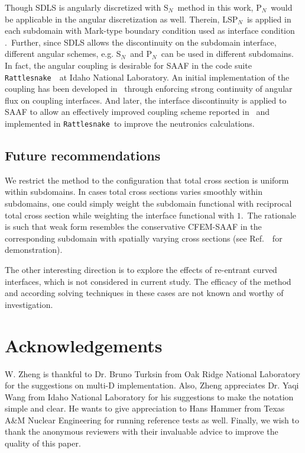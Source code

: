 \documentclass[review]{elsarticle}
\newcommand{\sn}{S$_N$}
\newcommand{\pn}{P$_N$}
\begin{document}
Though SDLS is angularly discretized with \sn\ method in this work, \pn\ would be applicable in the angular discretization as well. Therein, LS\pn\cite{zheng_invite,manteuffel_lspn_scaling,varin_lspn}\ is applied in each subdomain with Mark-type boundary condition used as interface condition \cite{sanchez-transport}.\ Further, since SDLS allows the discontinuity on the subdomain interface, different angular schemes, e.g. \sn\ and \pn\ can be used in different subdomains. {In fact, the angular coupling is desirable for SAAF in the code suite {\tt Rattlesnake}\ \cite{yaqi-rattlesnake}\ at Idaho National Laboratory. An initial implementation of the coupling has been developed in \cite{yaqi_physor16}\ through enforcing strong continuity of angular flux on coupling interfaces. And later, the interface discontinuity is applied to SAAF to allow an effectively improved coupling scheme reported in \cite{yaqi_invite,zheng-inl}\ and implemented in {\tt Rattlesnake}\ to improve the neutronics calculations.}

\subsection{Future recommendations}
{We restrict the method to the configuration that total cross section is uniform within subdomains. In cases total cross sections varies smoothly within subdomains, one could simply weight the subdomain functional with reciprocal total cross section while weighting the interface functional with $1$.\ The rationale is such that weak form resembles the conservative CFEM-SAAF in the corresponding subdomain with spatially varying cross sections (see Ref.\ \cite{zheng_dissertation}\ for demonstration).}

{The other interesting direction is to explore the effects of re-entrant curved interfaces, which is not considered in current study. The efficacy of the method and according solving techniques in these cases are not known and worthy of investigation.}
\section*{Acknowledgements}
W. Zheng is thankful to Dr. Bruno Turksin from Oak Ridge National Laboratory for the suggestions on multi-D implementation. Also, Zheng appreciates Dr. Yaqi Wang from Idaho National Laboratory for his suggestions to make the notation simple and clear. He wants to give appreciation to Hans Hammer from Texas A\&M Nuclear Engineering for running reference tests as well. Finally, we wish to thank the anonymous reviewers with their invaluable advice to improve the quality of this paper.
\end{document}
